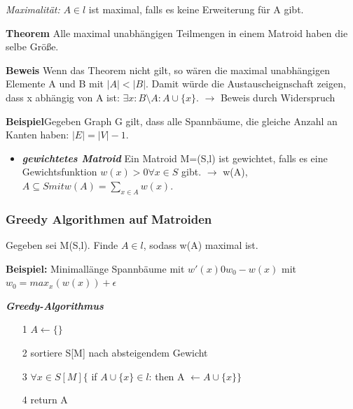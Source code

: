 \textit{Maximalität:} \newline $A \in l$ ist maximal, falls es keine Erweiterung für A gibt. \newline

\textbf{Theorem} \newline Alle maximal unabhängigen Teilmengen in einem Matroid haben die selbe Größe.

\textbf{Beweis} \newline Wenn das Theorem nicht gilt, so wären die maximal unabhängigen Elemente A und B mit $|A| < |B|$. Damit würde die Austauscheignschaft zeigen, dass x abhängig von A ist: $\exists x: B\setminus A: A \cup \{x\}$. $\rightarrow$ Beweis durch Widerspruch\newline

\textbf{Beispiel}\newline Gegeben Graph G gilt, dass alle Spannbäume, die gleiche Anzahl an Kanten haben: $|E| = |V| - 1$. \newline
\begin{itemize}
	\item \textbf{\textit{gewichtetes Matroid}} \newline Ein Matroid M=(S,l) ist gewichtet, falls es eine Gewichtsfunktion $w(x) > 0 \forall x \in S$ gibt. $\rightarrow$ w(A), $A \subseteq S mit w(A) = \sum_{x \in A} w(x)$.
\end{itemize}

\newpage
\subsubsection{Greedy Algorithmen auf Matroiden}

Gegeben sei M(S,l). Finde $A \in l$, sodass w(A) maximal ist.\newline

\textbf{Beispiel:} Minimallänge Spannbäume mit \newline $w'(x) 0 w_0 - w(x)$ mit $w_0 = max_{x}(w(x)) + \epsilon$ \newline

\textbf{\textit{Greedy-Algorithmus}}
\begin{itemize}
	\item[1] $A \leftarrow \{ \}$
	\item[2] sortiere S[M] nach absteigendem Gewicht
	\item[3] $\forall x \in S[M] \{$ if $A\cup \{x\} \in l$: then A $\leftarrow A \cup \{x\}\}$
	\item[4] return A
\end{itemize}

